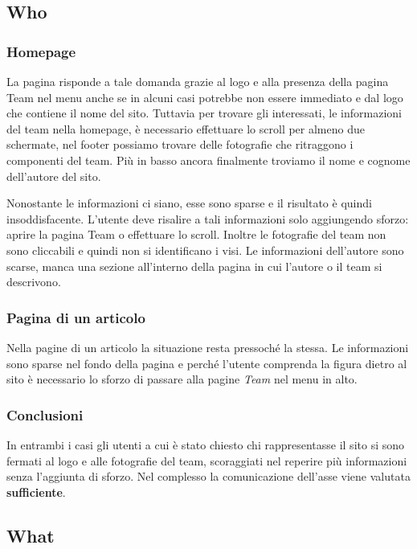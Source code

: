 	\subsection{Who}
		
		
		\subsubsection{Homepage}
			La pagina risponde a tale domanda grazie al logo e alla presenza della pagina Team nel menu anche se in alcuni casi potrebbe non essere immediato e dal logo che contiene il nome del sito. Tuttavia per trovare gli interessati, le informazioni del team nella homepage, è necessario effettuare lo scroll per almeno due schermate, nel footer possiamo trovare delle fotografie che ritraggono i componenti del team. Più in basso ancora finalmente troviamo il nome e cognome dell'autore del sito. 
			
			Nonostante le informazioni ci siano, esse sono sparse e il risultato è quindi insoddisfacente. L'utente deve risalire a tali informazioni solo aggiungendo sforzo: aprire la pagina Team o effettuare lo scroll. Inoltre le fotografie del team non sono cliccabili e quindi non si identificano i visi. Le informazioni dell'autore sono scarse, manca una sezione all'interno della pagina in cui l'autore o il team si descrivono.
		
		\subsubsection{Pagina di un articolo}
			Nella pagine di un articolo la situazione resta pressoché la stessa. Le informazioni sono sparse nel fondo della pagina e perché l'utente comprenda la figura dietro al sito è necessario lo sforzo di passare alla pagine \textit{Team} nel menu in alto.
			
		\subsubsection{Conclusioni}
			In entrambi i casi gli utenti a cui è stato chiesto chi rappresentasse il sito si sono fermati al logo e alle fotografie del team, scoraggiati nel reperire più informazioni senza l'aggiunta di sforzo. Nel complesso la comunicazione dell'asse viene valutata \textbf{sufficiente}.
	

	\subsection{What}
		
